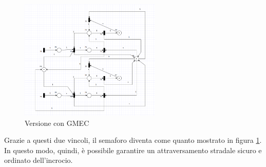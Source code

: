 \begin{figure}[h]
    \centering
    \includegraphics[width=0.6\textwidth]{figure/project_screenshots/semafori_con_controllo.png}
    \caption{Versione con GMEC}
    \label{fig:semafori_gmec}
\end{figure}

Grazie a questi due vincoli, il semaforo diventa come quanto mostrato in figura \ref{fig:semafori_gmec}. In questo modo, quindi, è possibile garantire un attraversamento stradale sicuro e ordinato dell'incrocio.